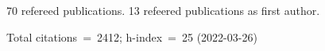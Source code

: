 70 refereed publications. 13 refeered publications as first author.

Total citations~=~2412; h-index~=~25 (2022-03-26)